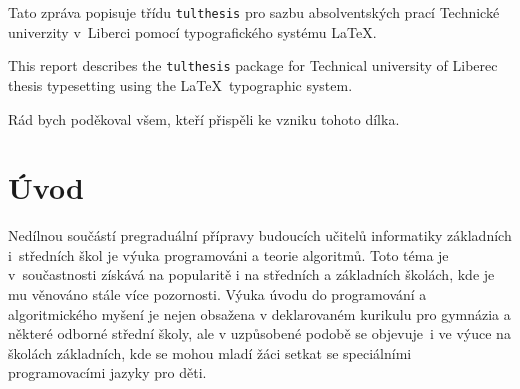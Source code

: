 \documentclass[FP,DP]{tulthesis}
\begin{document}

\begin{abstractCZ}
Tato zpráva popisuje třídu \texttt{tulthesis} pro sazbu absolventských prací
Technické univerzity v~Liberci pomocí typografického systému \LaTeX.
\end{abstractCZ}

\vspace{2cm}

\begin{abstractEN}
This report describes the \texttt{tulthesis} package for Technical university of
Liberec thesis typesetting using the \LaTeX\ typographic system.
\end{abstractEN}

\clearpage

\begin{acknowledgement}
Rád bych poděkoval všem, kteří přispěli ke vzniku tohoto dílka.
\end{acknowledgement}

\tableofcontents

\clearpage

\chapter{Úvod}
Nedílnou součástí pregraduální přípravy budoucích učitelů informatiky základních i~středních škol  je výuka programováni a teorie algoritmů. Toto téma je v~součastnosti získává na popularitě i na středních a základních školách, kde je mu věnováno stále více pozornosti. Výuka úvodu do programování a algoritmického myšení je nejen obsažena v deklarovaném kurikulu  pro gymnázia a některé odborné střední školy, ale v uzpůsobené podobě se objevuje~i ve výuce na školách základních, kde se mohou mladí žáci setkat se speciálními programovacími jazyky pro děti.
\end{document}
